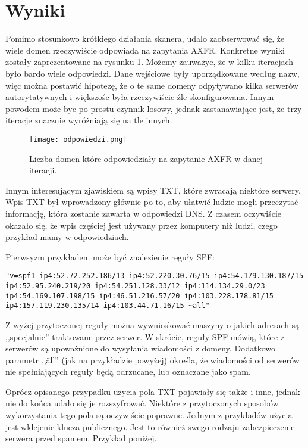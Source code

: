 \section{Wyniki}
Pomimo stosunkowo krótkiego działania skanera, udalo zaobserwować się, że wiele domen rzeczywiście odpowiada na zapytania AXFR. Konkretne wyniki zostały zaprezentowane na rysunku \ref{fig:odpowiedzi}. Możemy zauważyc, że w kilku iteracjach było bardo wiele odpowiedzi. Dane wejściowe były uporządkowane według nazw, więc można postawić hipotezę, że o te same domeny odpytywano kilka serwerów autorytatywnych i większośc była rzeczywiście źle skonfigurowana. Innym powodem może byc po prostu czynnik losowy, jednak zastanawiające jest, że trzy iteracje znacznie wyróżniają się na tle innych.


\begin{figure}
    \centering
        \texttt{[image: odpowiedzi.png]}
    \caption{ Liczba domen które odpowiedziały na zapytanie AXFR w danej iteracji.} \label{fig:odpowiedzi}
\end{figure}


Innym interesującym zjawiskiem są wpisy TXT\cite{RFC1035}, które zwracają niektóre serwery. Wpis TXT był wprowadzony głównie po to, aby ułatwić ludzie mogli przeczytać informację, która zostanie zawarta w odpowiedzi DNS. Z czasem oczywiście okazało się, że wpis częściej jest używany przez komputery niż ludzi, czego przykład mamy w odpowiedziach.

Pierwsyzm przykładem może być znalezienie reguły SPF\cite{RFC7208}:
\begin{lstlisting}
"v=spf1 ip4:52.72.252.186/13 ip4:52.220.30.76/15 ip4:54.179.130.187/15 ip4:52.95.240.219/20 ip4:54.251.128.33/12 ip4:114.134.29.0/23 ip4:54.169.107.198/15 ip4:46.51.216.57/20 ip4:103.228.178.81/15 ip4:157.119.230.135/14 ip4:103.44.71.16/15 ~all"
\end{lstlisting}

Z wyżej przytoczonej reguły można wywnioskować maszyny o jakich adresach są ,,specjalnie'' traktowane przez serwer. W skrócie, reguły SPF mówią, które z serwerów są upoważnione do wysyłania wiadomości z domeny. Dodatkowo parametr ,,\~all'' (jak na przykładzie powyżej) określa, że wiadomości od serwerów nie spełniających reguły będą odrzucane, lub oznaczane jako spam.

Oprócz opisanego przypadku użycia pola TXT pojawiały się także i inne, jednak nie do końca udało się je rozszyfrować. Niektóre z przytoczonych sposobów wykorzystania tego pola są oczywiście poprawne. Jednym z przykładów użycia jest wklejenie klucza publicznego. Jest to również swego rodzaju zabezpieczenie serwera przed spamem. Przykład poniżej.

